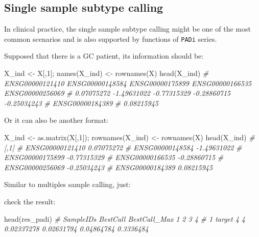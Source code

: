 \documentclass[
  12pt,
]{book}
\newenvironment{Shaded}{\begin{snugshade}}{\end{snugshade}}
\newcommand{\CommentTok}[1]{\textcolor[rgb]{0.56,0.35,0.01}{\textit{#1}}}
\newcommand{\DecValTok}[1]{\textcolor[rgb]{0.00,0.00,0.81}{#1}}
\newcommand{\FunctionTok}[1]{\textcolor[rgb]{0.00,0.00,0.00}{#1}}
\newcommand{\NormalTok}[1]{#1}
\newcommand{\OtherTok}[1]{\textcolor[rgb]{0.56,0.35,0.01}{#1}}
\begin{document}
\hypertarget{single-sample-subtype-calling}{%
\subsection{Single sample subtype calling}\label{single-sample-subtype-calling}}

In clinical practice, the single sample subtype calling might be one of the most common scenarios and is also supported by functions of \texttt{PADi} series.

Supposed that there is a GC patient, its information should be:

\begin{Shaded}
\begin{Highlighting}[]
\NormalTok{X\_ind }\OtherTok{\textless{}{-}}\NormalTok{ X[,}\DecValTok{1}\NormalTok{]; }\FunctionTok{names}\NormalTok{(X\_ind) }\OtherTok{\textless{}{-}} \FunctionTok{rownames}\NormalTok{(X)}
\FunctionTok{head}\NormalTok{(X\_ind)}
\CommentTok{\# ENSG00000121410 ENSG00000148584 ENSG00000175899 ENSG00000166535 ENSG00000256069 }
\CommentTok{\#      0.07075272     {-}1.49631022     {-}0.77315329     {-}0.28860715     {-}0.25034243 }
\CommentTok{\# ENSG00000184389 }
\CommentTok{\#      0.08215945}
\end{Highlighting}
\end{Shaded}

Or it can also be another format:

\begin{Shaded}
\begin{Highlighting}[]
\NormalTok{X\_ind }\OtherTok{\textless{}{-}} \FunctionTok{as.matrix}\NormalTok{(X[,}\DecValTok{1}\NormalTok{]); }\FunctionTok{rownames}\NormalTok{(X\_ind) }\OtherTok{\textless{}{-}} \FunctionTok{rownames}\NormalTok{(X)}
\FunctionTok{head}\NormalTok{(X\_ind)}
\CommentTok{\#                        [,1]}
\CommentTok{\# ENSG00000121410  0.07075272}
\CommentTok{\# ENSG00000148584 {-}1.49631022}
\CommentTok{\# ENSG00000175899 {-}0.77315329}
\CommentTok{\# ENSG00000166535 {-}0.28860715}
\CommentTok{\# ENSG00000256069 {-}0.25034243}
\CommentTok{\# ENSG00000184389  0.08215945}
\end{Highlighting}
\end{Shaded}

Similar to multiples sample calling, just:

check the result:

\begin{Shaded}
\begin{Highlighting}[]
\FunctionTok{head}\NormalTok{(res\_padi)}
\CommentTok{\#   SampleIDs BestCall BestCall\_Max          1          2          3         4}
\CommentTok{\# 1    target        4            4 0.02337278 0.02631794 0.04864784 0.3336484}
\end{Highlighting}
\end{Shaded}
\end{document}
